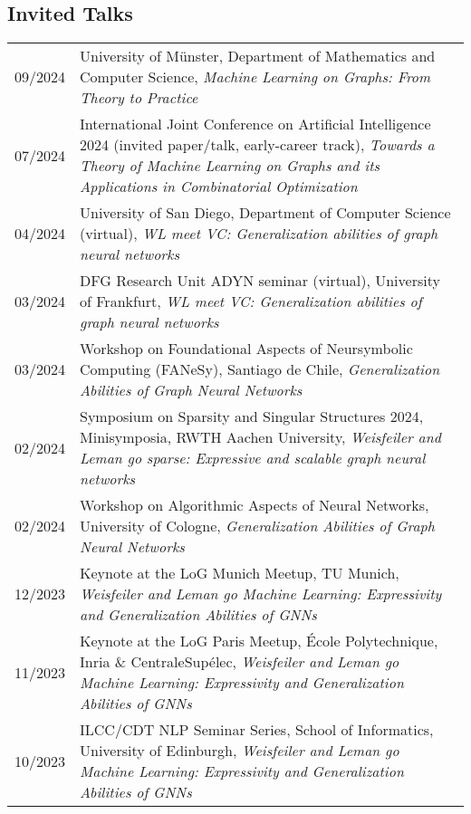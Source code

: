 \documentclass[11pt, a4paper, DIV=14, headings=small]{scrartcl}
\begin{document}
	\subsection*{Invited Talks}
	\begin{longtabu}{p{2.1cm}p{12.0cm}}
		 09/2024 &University of Münster, Department of Mathematics and Computer Science, \emph{Machine Learning on Graphs: From Theory to Practice
		 }\\ 
		 07/2024 & International Joint Conference on Artificial Intelligence 2024 (invited paper/talk, early-career track), \emph{Towards a Theory of Machine Learning on Graphs and its Applications in Combinatorial Optimization}\\ 
		   04/2024 & University of San Diego, Department of Computer Science (virtual), \emph{WL meet VC: Generalization abilities of graph neural networks}\\ 
	     03/2024 & DFG Research Unit ADYN seminar (virtual), University of Frankfurt, \emph{WL meet VC: Generalization abilities of graph neural networks}\\
	     03/2024 & Workshop on Foundational Aspects of Neursymbolic Computing (FANeSy), Santiago de Chile, \emph{Generalization Abilities of Graph Neural Networks}\\ 
  	02/2024 & Symposium on Sparsity and Singular Structures 2024, Minisymposia, RWTH Aachen University, \emph{Weisfeiler and Leman go sparse: Expressive and scalable graph neural networks}\\   
	     02/2024 & Workshop on Algorithmic Aspects of Neural Networks, University of Cologne, \emph{Generalization Abilities of Graph Neural Networks}\\    
        12/2023 & Keynote at the LoG Munich Meetup, TU Munich, \emph{Weisfeiler and Leman go Machine Learning: Expressivity and Generalization Abilities of GNNs}\\             
		11/2023 & Keynote at the LoG Paris Meetup, École Polytechnique, Inria \& CentraleSupélec, \emph{Weisfeiler and Leman go Machine Learning: Expressivity and Generalization Abilities of GNNs}\\    
		10/2023 & ILCC/CDT NLP Seminar Series, School of Informatics, University of Edinburgh, \emph{Weisfeiler and Leman go Machine Learning: Expressivity and Generalization Abilities of GNNs}\\    

\end{longtabu}
\end{document}
